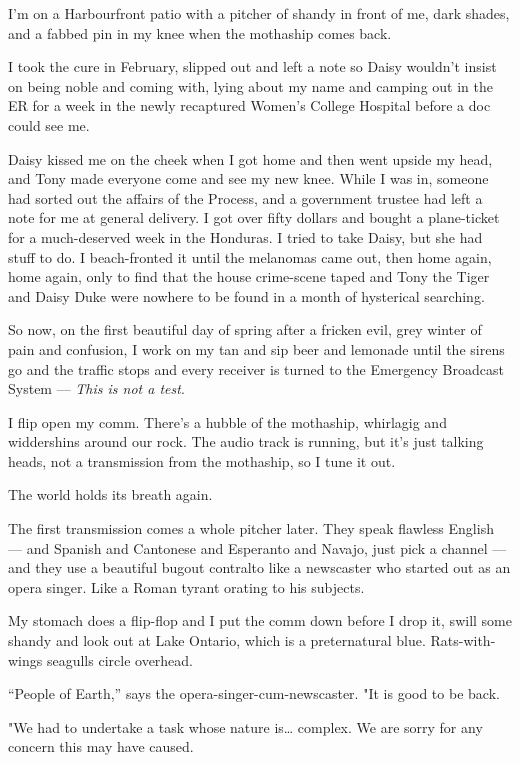 \tb

I'm on a Harbourfront patio with a pitcher of shandy in front of
me, dark shades, and a fabbed pin in my knee when the mothaship
comes back.

I took the cure in February, slipped out and left a note so Daisy
wouldn't insist on being noble and coming with, lying about my name
and camping out in the ER for a week in the newly recaptured
Women's College Hospital before a doc could see me.

Daisy kissed me on the cheek when I got home and then went upside
my head, and Tony made everyone come and see my new knee. While I
was in, someone had sorted out the affairs of the Process, and a
government trustee had left a note for me at general delivery. I
got over fifty dollars and bought a plane-ticket for a
much-deserved week in the Honduras. I tried to take Daisy, but she
had stuff to do. I beach-fronted it until the melanomas came out,
then home again, home again, only to find that the house
crime-scene taped and Tony the Tiger and Daisy Duke were nowhere to
be found in a month of hysterical searching.

So now, on the first beautiful day of spring after a fricken evil,
grey winter of pain and confusion, I work on my tan and sip beer
and lemonade until the sirens go and the traffic stops and every
receiver is turned to the Emergency Broadcast System ---
\emph{This is not a test}.

I flip open my comm. There's a hubble of the mothaship, whirlagig
and widdershins around our rock. The audio track is running, but
it's just talking heads, not a transmission from the mothaship, so
I tune it out.

The world holds its breath again.

\tb

The first transmission comes a whole pitcher later. They speak
flawless English --- and Spanish and Cantonese and Esperanto and
Navajo, just pick a channel --- and they use a beautiful bugout
contralto like a newscaster who started out as an opera singer.
Like a Roman tyrant orating to his subjects.

My stomach does a flip-flop and I put the comm down before I drop
it, swill some shandy and look out at Lake Ontario, which is a
preternatural blue. Rats-with-wings seagulls circle overhead.

``People of Earth,'' says the opera-singer-cum-newscaster. "It is
good to be back.

"We had to undertake a task whose nature is\ldots{} complex. We are
sorry for any concern this may have caused.

